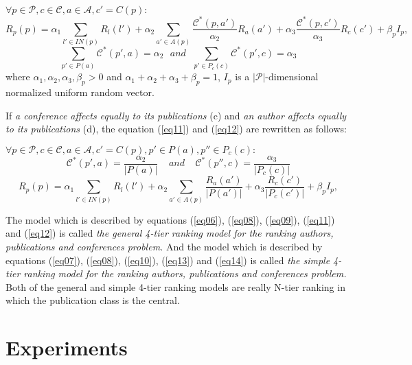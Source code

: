 \documentclass[lnicst]{svmultln}
\begin{document}
\begin{enumerate}
$\forall p\in\mathcal{P},  c\in\mathcal{C},  a\in\mathcal{A},c' = C(p):$
\setlength{\parskip}{6pt}
\begin{equation} \label {eq11}
R_p(p) = \alpha_1\sum_{l'\in IN(p)}R_l(l') +  \alpha_2 \sum_{a'\in A(p)}\frac{\mathcal{C}^*(p,a')}{\alpha_2}R_a(a') + \alpha_3\frac{\mathcal{C}^*(p,c')}{\alpha_3}R_c(c')+ \beta_pI_p,
\end{equation}
\begin{equation}\label{eq12}
\sum_{p'\in P(a)}\mathcal{C}^*(p',a)=\alpha_2~~~and~~~\sum_{p'\in P_c(c)}\mathcal{C}^*(p',c)=\alpha_3 
\end{equation}
where $\alpha_1,\alpha_2,\alpha_3,\beta_p > 0$ and $\alpha_1 + \alpha_2 + \alpha_3 + \beta_p = 1$, $I_p$ is a $|\mathcal{P}|$-dimensional normalized uniform random vector. 

If \textit{a conference affects equally to  its publications} (c) and \textit{an author affects equally to  its publications} (d),  the equation (\ref{eq11}) and (\ref{eq12})  are rewritten as follows:

$\forall p\in\mathcal{P},  c\in\mathcal{C},  a\in\mathcal{A},c' = C(p), p'\in P(a), p''\in P_c(c):$
\setlength{\parskip}{6pt}
\begin{equation}\label{eq13}
\mathcal{C}^*(p',a)=\frac{\alpha_2}{|P(a)|}~~~~~and~~~~~\mathcal{C}^*(p'',c)=\frac{\alpha_3}{|P_c(c)|} 
\end{equation}
\begin{equation}\label{eq14}
R_p(p) = \alpha_1\sum_{l'\in IN(p)}R_l(l') + \alpha_2\sum_{a'\in A(p)}\frac{R_a(a')}{|P(a')|} + \alpha_3\frac{R_c(c')}{|P_c(c')|} + \beta_pI_p,
\end{equation}
\end{enumerate}
The model which is described by equations (\ref{eq06}), (\ref{eq08}), (\ref{eq09}), (\ref{eq11}) and (\ref{eq12})
is called  \textit{ the general 4-tier ranking model for the ranking authors, publications and conferences problem.} And the model which is described by equations (\ref{eq07}), (\ref{eq08}), (\ref{eq10}), (\ref{eq13}) and (\ref{eq14})
is called  \textit{ the simple 4-tier ranking model for the ranking authors, publications and conferences problem.} Both of the general and simple  4-tier ranking models are really N-tier ranking in which the publication class is the central. 


\section{Experiments}\label{Sect:Experiments}
\end{document}
